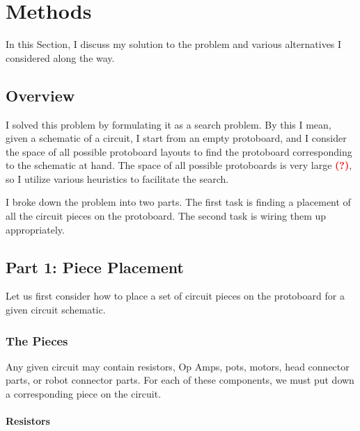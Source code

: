 
\chapter{Methods}

In this Section, I discuss my solution to the problem and various alternatives I
considered along the way.

\section{Overview}

I solved this problem by formulating it as a search problem. By this I mean,
given a schematic of a circuit, I start from an empty protoboard, and I consider
the space of all possible protoboard layouts to find the protoboard
corresponding to the schematic at hand. The space of all possible protoboards is
very large \textcolor{red}{\textbf{(?)}}, so I utilize various heuristics to
facilitate the search.

I broke down the problem into two parts. The first task is finding a placement
of all the circuit pieces on the protoboard. The second task is wiring them up
appropriately.

\section{Part 1: Piece Placement}

Let us first consider how to place a set of circuit pieces on the protoboard for
a given circuit schematic.

\subsection{The Pieces}

Any given circuit may contain resistors, Op Amps, pots, motors, head connector
parts, or robot connector parts. For each of these components, we must put down
a corresponding piece on the circuit.

\subsubsection{Resistors}

